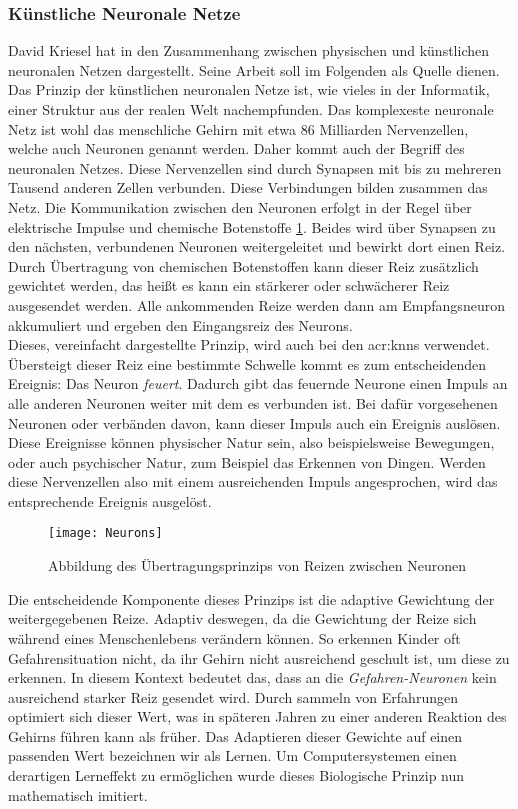 \subsubsection{Künstliche Neuronale Netze}
\label{sec:KNN}
David Kriesel hat in \cite{bib:UebereblickNN} den Zusammenhang zwischen physischen und künstlichen neuronalen Netzen dargestellt. Seine Arbeit soll im Folgenden als Quelle dienen. Das Prinzip der künstlichen neuronalen Netze ist, wie vieles in der Informatik, einer Struktur aus der realen Welt nachempfunden. Das komplexeste neuronale Netz ist wohl das menschliche Gehirn mit etwa 86 Milliarden Nervenzellen, welche auch Neuronen genannt werden. Daher kommt auch der Begriff des neuronalen Netzes. Diese Nervenzellen sind durch Synapsen mit bis zu mehreren Tausend anderen Zellen verbunden. Diese Verbindungen bilden zusammen das Netz. Die Kommunikation zwischen den Neuronen erfolgt in der Regel über elektrische Impulse und chemische Botenstoffe \ref{fig:Neurons}. Beides wird über Synapsen zu den nächsten, verbundenen Neuronen weitergeleitet und bewirkt dort einen Reiz. Durch Übertragung von chemischen Botenstoffen kann dieser Reiz zusätzlich gewichtet werden, das heißt es kann ein stärkerer oder schwächerer Reiz ausgesendet werden. Alle ankommenden Reize werden dann am Empfangsneuron akkumuliert und ergeben den Eingangsreiz des Neurons.\\ 

Dieses, vereinfacht dargestellte Prinzip, wird auch bei den \acrshort{acr:knn}s verwendet. Übersteigt dieser Reiz eine bestimmte Schwelle kommt es zum entscheidenden Ereignis: Das Neuron \textit{feuert}. Dadurch gibt das feuernde Neurone einen Impuls an alle anderen Neuronen weiter mit dem es verbunden ist. Bei dafür vorgesehenen Neuronen oder verbänden davon, kann dieser Impuls auch ein Ereignis auslösen. Diese Ereignisse können physischer Natur sein, also beispielsweise Bewegungen, oder auch psychischer Natur, zum Beispiel das Erkennen von Dingen. Werden diese Nervenzellen also mit einem ausreichenden Impuls angesprochen, wird das entsprechende Ereignis ausgelöst.\\

\begin{figure}%
	\centering
    \texttt{[image: Neurons]}
    \caption{Abbildung des Übertragungsprinzips von Reizen zwischen Neuronen \cite{bib:Neurons}}
    \label{fig:Neurons}
\end{figure}

Die entscheidende Komponente dieses Prinzips ist die adaptive Gewichtung der weitergegebenen Reize. Adaptiv deswegen, da die Gewichtung der Reize sich während eines Menschenlebens verändern können. So erkennen Kinder oft Gefahrensituation nicht, da ihr Gehirn nicht ausreichend geschult ist, um diese zu erkennen. In diesem Kontext bedeutet das, dass an die \textit{Gefahren-Neuronen} kein ausreichend starker Reiz gesendet wird. Durch sammeln von Erfahrungen optimiert sich dieser Wert, was in späteren Jahren zu einer anderen Reaktion des Gehirns führen kann als früher. Das Adaptieren dieser Gewichte auf einen passenden Wert bezeichnen wir als Lernen. Um Computersystemen einen derartigen Lerneffekt zu ermöglichen wurde dieses Biologische Prinzip nun mathematisch imitiert. \\

